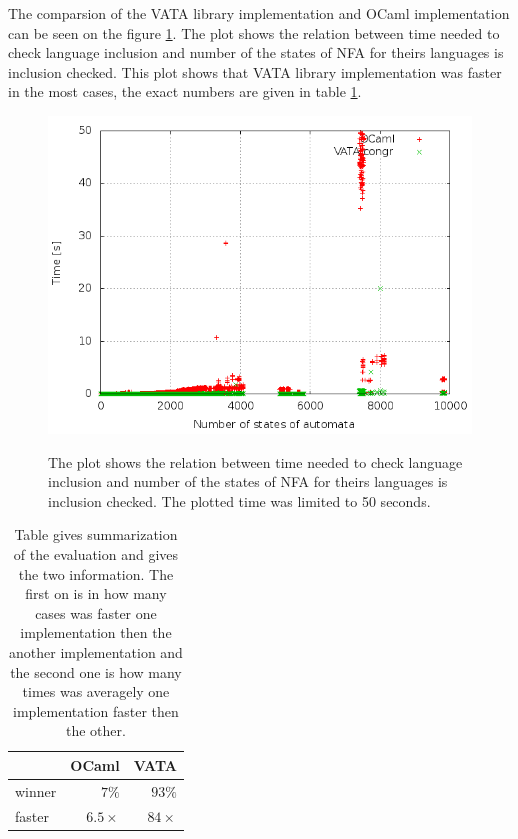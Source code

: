 The comparsion of the VATA library implementation and OCaml implementation can be seen on the figure \ref{figGraphOCaml}. The plot shows the relation between 
time needed to check language inclusion and number of the states of NFA for theirs languages is inclusion checked. This plot shows that VATA library
implementation was faster in the most cases, the exact numbers are given in table \ref{tabOcaml}.

\begin{figure}
\begin{center}
\includegraphics[scale=0.5]{fig/plot_hkc_zprava.png}
\label{figGraphOCaml}
\caption{The plot shows the relation between time needed to check language inclusion and number of the states of NFA for theirs languages is inclusion checked.
The plotted time was limited to 50 seconds.}
\end{center}
\end{figure}

\begin{center}
\begin{table}
\begin{center}
  \begin{tabular}{ | l | r | r |}
   \hline
    & \textbf{OCaml} & \textbf{VATA} \\ \hline \hline
    winner & $7\%$ & $93\%$ \\ \hline
    faster & $6.5\times$ & $84\times$ \\ \hline
   \end{tabular}
   \caption{Table gives summarization of the evaluation and gives the two information. The first on is
     in how many cases was faster one implementation then the another implementation 
   and the second one is how many times was averagely one implementation faster then the other.}
   \label{tabOcaml}
\end{center}
\end{table}
\end{center}

